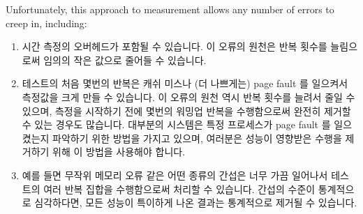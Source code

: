 Unfortunately, this approach to measurement allows any number of errors
to creep in, including:

\fi

\begin{enumerate}
\item	시간 측정의 오버헤드가 포함될 수 있습니다.
	이 오류의 원천은 반복 횟수를 늘림으로써 임의의 작은 값으로 줄어들 수
	있습니다.
\item	테스트의 처음 몇번의 반복은 캐쉬 미스나 (더 나쁘게는) page fault 를
	일으켜서 측정값을 크게 만들 수 있습니다.
	이 오류의 원천 역시 반복 횟수를 늘려서 줄일 수 있으며, 측정을 시작하기
	전에 몇번의 워밍업 반복을 수행함으로써 완전히 제거할 수 있는 경우도
	많습니다.
	대부분의 시스템은 특정 프로세스가 page fault 를 일으켰는지 파악하기
	위한 방법을 가지고 있으며, 여러분은 성능이 영향받은 수행을 제거하기
	위해 이 방법을 사용해야 합니다.
\item	예를 들면 무작위 메모리 오류 같은 어떤 종류의 간섭은 너무 가끔 일어나서
	테스트의 여러 반복 집합을 수행함으로써 처리할 수 있습니다.
	간섭의 수준이 통계적으로 심각하다면, 모든 성능이 특이하게 나온 결과는
	통계적으로 제거될 수 있습니다.

\end{enumerate}
